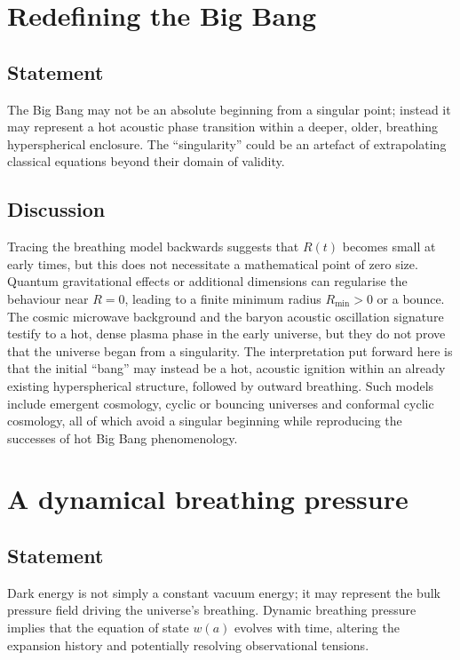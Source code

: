 \documentclass[12pt,a4paper]{article}
\begin{document}
\section{Redefining the Big Bang}
\label{sec:bigbang}
\subsection{Statement}
The Big Bang may not be an absolute beginning from a singular point; instead it may represent a hot acoustic phase transition within a deeper, older, breathing hyperspherical enclosure.  The ``singularity'' could be an artefact of extrapolating classical equations beyond their domain of validity.

\subsection{Discussion}
Tracing the breathing model backwards suggests that $R(t)$ becomes small at early times, but this does not necessitate a mathematical point of zero size.  Quantum gravitational effects or additional dimensions can regularise the behaviour near $R=0$, leading to a finite minimum radius $R_{\min} > 0$ or a bounce.  The cosmic microwave background and the baryon acoustic oscillation signature testify to a hot, dense plasma phase in the early universe, but they do not prove that the universe began from a singularity.  The interpretation put forward here is that the initial ``bang'' may instead be a hot, acoustic ignition within an already existing hyperspherical structure, followed by outward breathing.  Such models include emergent cosmology, cyclic or bouncing universes and conformal cyclic cosmology, all of which avoid a singular beginning while reproducing the successes of hot Big Bang phenomenology.

\section{A dynamical breathing pressure}
\label{sec:darkenergy}
\subsection{Statement}
Dark energy is not simply a constant vacuum energy; it may represent the bulk pressure field driving the universe’s breathing.  Dynamic breathing pressure implies that the equation of state $w(a)$ evolves with time, altering the expansion history and potentially resolving observational tensions.
\end{document}
